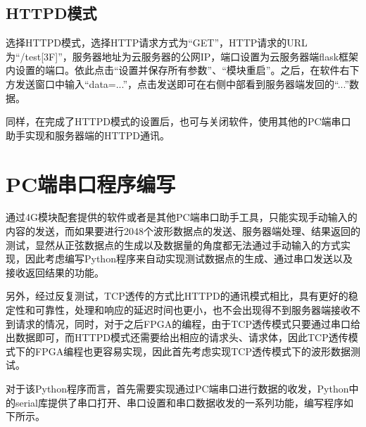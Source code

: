 \documentclass[a4paper,11pt]{ctexart}
\begin{document}
\begin{spacing}{1.5}
\subsection{HTTPD模式}
\par
选择HTTPD模式，选择HTTP请求方式为“GET”，HTTP请求的URL为“/test[3F]”，服务器地址为云服务器的公网IP，端口设置为云服务器端flask框架内设置的端口。依此点击“设置并保存所有参数”、“模块重启”。之后，在软件右下方发送窗口中输入“data=...”，点击发送即可在右侧中部看到服务器端发回的“...”数据。
\par
同样，在完成了HTTPD模式的设置后，也可与关闭软件，使用其他的PC端串口助手实现和服务器端的HTTPD通讯。

\section{PC端串口程序编写}
\par
通过4G模块配套提供的软件或者是其他PC端串口助手工具，只能实现手动输入的内容的发送，而如果要进行2048个波形数据点的发送、服务器端处理、结果返回的测试，显然从正弦数据点的生成以及数据量的角度都无法通过手动输入的方式实现，因此考虑编写Python程序来自动实现测试数据点的生成、通过串口发送以及接收返回结果的功能。
\par
另外，经过反复测试，TCP透传的方式比HTTPD的通讯模式相比，具有更好的稳定性和可靠性，处理和响应的延迟时间也更小，也不会出现得不到服务器端接收不到请求的情况，同时，对于之后FPGA的编程，由于TCP透传模式只要通过串口给出数据即可，而HTTPD模式还需要给出相应的请求头、请求体，因此TCP透传模式下的FPGA编程也更容易实现，因此首先考虑实现TCP透传模式下的波形数据测试。
\par
对于该Python程序而言，首先需要实现通过PC端串口进行数据的收发，Python中的serial库提供了串口打开、串口设置和串口数据收发的一系列功能，编写程序如下所示。




\end{spacing}


	
\end{document}
